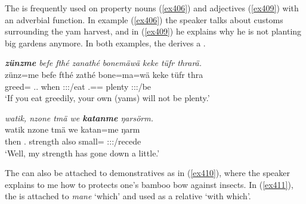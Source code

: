 The   is frequently used on property nouns (\ref{ex406}) and adjectives (\ref{ex409}) with an adverbial function. In example (\ref{ex406}) the speaker talks about customs surrounding the yam harvest, and in (\ref{ex409}) he explains why he is not planting big gardens anymore. In both examples, the   derives a .  

\begin{exe}
	\ex \emph{\textbf{zünzme} befe fthé zanathé bonemäwä keke tüfr thrarä.}\\
	\gll zünz=me befe fthé zathé bone=ma=wä keke tüfr thra\\
	greed=\Ins{} \Ssg.\Erg.\Emph{} when \Ssg:\Sbj:\Imp:\Pfv/eat \Ssg.\Poss=\Char=\Emph{} \Neg{} plenty \Stpl:\Sbj:\Irr:\Ipfv/be\\
	\trans `If you eat greedily, your own (yams) will not be plenty.'\\
	\label{ex406}
\end{exe}
\begin{exe}
	\ex \emph{watik, nzone tmä we \textbf{katanme} ŋarsörm.}\\
	\gll watik nzone tmä we katan=me ŋarm\\
	then \Fsg.\Poss{} strength also small=\Ins{} \Stsg:\Sbj:\Rpst:\Dur/recede\\
	\trans `Well, my strength has gone down a little.'
	\label{ex409}
\end{exe}
	
The   can also be attached to demonstratives as in (\ref{ex410}), where the speaker explains to me how to protects one's bamboo bow against insects. In (\ref{ex411}), the  is attached to \emph{mane} `which' and used as a relative  `with which'.

